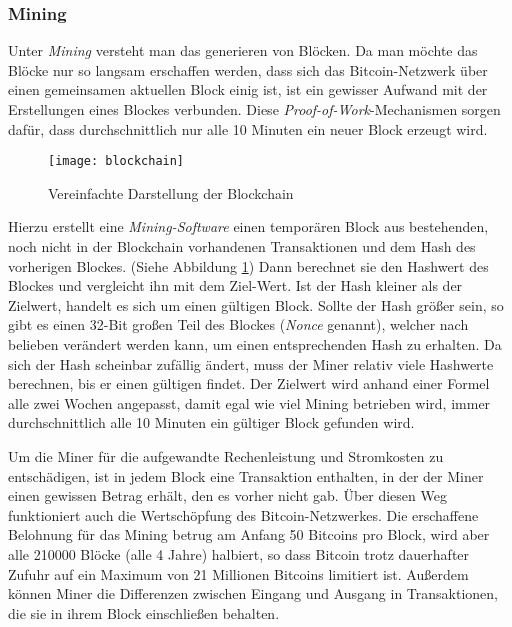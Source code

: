 \subsubsection{Mining}
\label{subsec:mining}

Unter \emph{Mining} versteht man das generieren von Blöcken.
Da man möchte das Blöcke nur so langsam erschaffen werden, dass sich das Bitcoin-Netzwerk über einen gemeinsamen aktuellen Block einig ist, ist ein gewisser Aufwand mit der Erstellungen eines Blockes verbunden.
Diese \emph{Proof-of-Work}-Mechanismen sorgen dafür, dass durchschnittlich nur alle 10 Minuten ein neuer Block erzeugt wird.

\begin{figure}
    \begin{center}
        \texttt{[image: blockchain]}
        \caption{Vereinfachte Darstellung der Blockchain \parencite[3]{nakamoto}}
        \label{fig:blockchain}
    \end{center}
\end{figure}

Hierzu erstellt eine \emph{Mining-Software} einen temporären Block aus bestehenden, noch nicht in der Blockchain vorhandenen Transaktionen und dem Hash des vorherigen Blockes.
(Siehe Abbildung \ref{fig:blockchain})
Dann berechnet sie den Hashwert des Blockes und vergleicht ihn mit dem Ziel-Wert.
Ist der Hash kleiner als der Zielwert, handelt es sich um einen gültigen Block.
Sollte der Hash größer sein, so gibt es einen 32-Bit großen Teil des Blockes (\emph{Nonce} genannt), welcher nach belieben verändert werden kann, um einen entsprechenden Hash zu erhalten.
Da sich der Hash scheinbar zufällig ändert, muss der Miner relativ viele Hashwerte berechnen, bis er einen gültigen findet.
Der Zielwert wird anhand einer Formel alle zwei Wochen angepasst, damit egal wie viel Mining betrieben wird, immer durchschnittlich alle 10 Minuten ein gültiger Block gefunden wird.

Um die Miner für die aufgewandte Rechenleistung und Stromkosten zu entschädigen, ist in jedem Block eine Transaktion enthalten, in der der Miner einen gewissen Betrag erhält, den es vorher nicht gab.
Über diesen Weg funktioniert auch die Wertschöpfung des Bitcoin-Netzwerkes.
Die erschaffene Belohnung für das Mining betrug am Anfang 50 Bitcoins pro Block, wird aber alle 210000 Blöcke (alle 4 Jahre) halbiert, so dass Bitcoin trotz dauerhafter Zufuhr auf ein Maximum von 21 Millionen Bitcoins limitiert ist.
Außerdem können Miner die Differenzen zwischen Eingang und Ausgang in Transaktionen, die sie in ihrem Block einschließen behalten.

